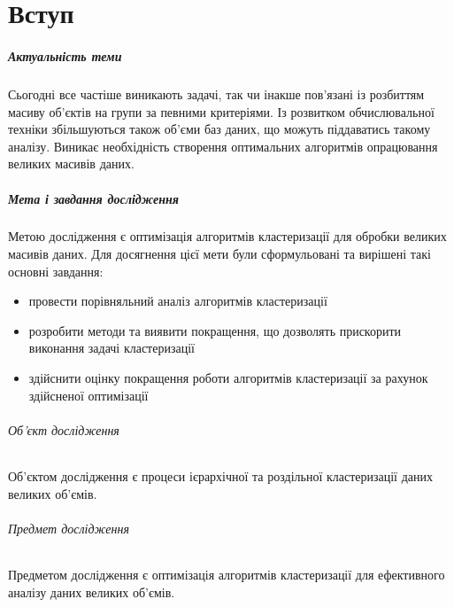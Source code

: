 \chapter*{Вступ}

\paragraph{Актуальність теми}

Сьогодні все частіше виникають задачі, так чи інакше пов'язані із розбиттям масиву об'єктів на групи за певними критеріями. Із розвитком обчислювальної техніки збільшуються також об'єми баз даних, що можуть піддаватись такому аналізу. Виникає необхідність створення оптимальних алгоритмів опрацювання великих масивів даних.

\paragraph{Мета і завдання дослідження}

Метою дослідження є оптимізація алгоритмів кластеризації для обробки великих масивів даних.
Для досягнення цієї мети були сформульовані та вирішені такі основні завдання:
\begin{itemize}
    \item провести порівняльний аналіз алгоритмів кластеризації
    \item розробити методи та виявити покращення, що дозволять прискорити виконання задачі кластеризації
    \item здійснити оцінку покращення роботи алгоритмів кластеризації за рахунок здійсненої оптимізації
\end{itemize}

\subparagraph{Об'єкт дослідження}
Об’єктом дослідження є процеси ієрархічної та роздільної кластеризації даних великих об’ємів.

\subparagraph{Предмет дослідження}
Предметом дослідження є оптимізація алгоритмів кластеризації для ефективного аналізу даних великих об’ємів.

